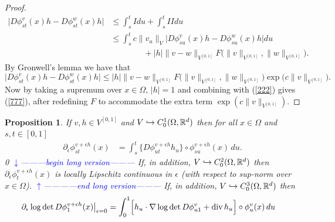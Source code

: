 \documentclass[noinfoline]{imsart}
\newtheorem{proposition}{Proposition}
\def\Ver{1}
\def\LongVer{0}
\begin{document}
\begin{proof}
\begin{align*}
\bigl|D \phi_{st}^v(x)h -  D \phi_{st}^w(x)h\bigr | & \leq \int_s^t I du + \int_s^t I\!I du \\
&\leq  \int_s^t c\bigl\| v_u\bigl\|_{V} \bigl|   D \phi_{su}^v(x)h - D \phi_{su}^w(x)h  \bigr| du \\
&\qquad\qquad +  |h|  \|v-w\|_{V^{[0,1]}}  F\bigl(\|v \|_{V^{[0,1]}},\| w\|_{V^{[0,1]}}\bigr).
\end{align*}
By Gronwell's lemma we have that
\[\bigl|D \phi_{st}^v(x)h -  D \phi_{st}^w(x)h\bigr | \leq  |h|  \|v-w\|_{V^{[0,1]}}  F\bigl(\|v \|_{V^{[0,1]}},\| w\|_{V^{[0,1]}}\bigr) \exp\bigl ( c \bigl\| v\bigl\|_{V^{[0,1]}} \bigr) . \]
Now by taking a supremum over $x\in \Omega$, $|h|=1$ and combining with (\ref{222}) gives (\ref{777}), after redefining $F$ to accommodate the extra term $\exp ( c \bigl\| v\bigl\|_{V^{[0,1]}} )$.






\end{proof}

\begin{proposition}
\label{proo}
If $v,h \in V^{[0,1]}$ and $V\hookrightarrow C_0^1(\Omega,\Bbb R^d)$ then for all $x\in \Omega$ and $s,t\in [0,1]$
\begin{align}
{\partial_\epsilon}  \phi^{ v+\epsilon h}_{st}(x)  &= \int_s^t  \bigl\{D\phi^{ v+\epsilon h}_{ut} h_u \bigr\}\circ{\phi^{ v+\epsilon h}_{su}(x)}\,   du. \label{111}
 \end{align}
\if\Ver\LongVer{
{\flushleft\textcolor{blue}{$\downarrow$---------begin long version---------}}\newline
If, in addition, $V\hookrightarrow C_0^2(\Omega,\Bbb R^d)$ then ${\partial_\epsilon}  \phi^{ v+\epsilon h}_t(x)  $ is locally Lipschitz continuous in $\epsilon$   (with respect to sup-norm over $x\in \Omega$).
   {\flushleft\textcolor{blue}{$\uparrow$------------end long version---------}}\newline
} \fi
If, in addition,  $V\hookrightarrow C_0^3(\Omega,\Bbb R^d)$ then
\begin{align}
  \label{888}
\partial_\epsilon  \log \det D\phi_{1}^{v+\epsilon h }(x)\bigr|_{\epsilon = 0} & = \int_0^1  \Bigl[ h_u \cdot \nabla \log\det D\phi_{u1}^v  + \text{\rm div}\, h_u\Bigr] \circ  \phi^v_{u}(x)  \, du
\end{align}
\end{proposition}
\end{document}
